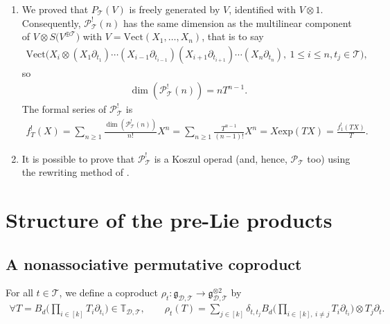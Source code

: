 \documentclass[10pt,a4paper]{amsart}
\numberwithin{equation}{section}
\newcommand{\T}{\mathcal{T}}
\newcommand{\D}{\mathcal{D}}
\newcommand{\g}{\mathfrak{g}}
\newcommand{\bfT}{\mathbb{T}}
\renewcommand{\P}{\mathcal{P}}
\begin{document}
{\samepage\begin{Remark}\qquad

\begin{enumerate}\itemsep=0pt
\item We proved that $P_\T(V)$ is freely generated by $V$, identified with $V\otimes 1$. Consequently,
$\P_\T^!(n)$ has the same dimension as the multilinear component of $V\otimes S\big(V^{\oplus\T}\big)$ with
$V=\mathrm{Vect}(X_1,\dots,X_n)$, that is to say
\begin{gather*}
\mathrm{Vect}\big(X_i\otimes(X_1\partial_{t_1})\cdots (X_{i-1}\partial_{t_{i-1}})(X_{i+1}\partial_{t_{i+1}})
\cdots (X_n\partial_{t_n}),\: 1\leq i \leq n, t_j\in \T\big),
\end{gather*}
so
\begin{gather*}
\dim(\P_\T^!(n))=n T^{n-1}.
\end{gather*}
The formal series of $\P_\T^!$ is
\begin{gather*}
f^!_T(X)=\sum_{n\geq 1} \frac{\dim(\P_\T^!(n))}{n!} X^n
=\sum_{n\geq 1} \frac{T^{n-1}}{(n-1)!} X^n=X\mathrm{exp}(TX)=\frac{f^!_1(TX)}{T}.
\end{gather*}
\item It is possible to prove that $\P_\T^!$ is a Koszul operad (and, hence, $\P_\T$ too) using the rewriting method of \cite{Vallette}.
\end{enumerate}\end{Remark}

}

\section{Structure of the pre-Lie products}

\subsection{A nonassociative permutative coproduct}

For all $t\in \T$, we define a coproduct $\rho_t\colon \g_{\D,\T}\longrightarrow \g_{\D,\T}^{\otimes 2}$ by
\begin{gather*}
\forall T=B_d\bigg(\prod_{i\in [k]} T_i \partial_{t_i}\bigg) \in \bfT_{\D,\T},\qquad
\rho_t(T)=\sum_{j\in [k]}\delta_{t,t_j} B_d\bigg(\prod_{i\in [k],\:i\neq j} T_i \partial_{t_i}\bigg) \otimes T_j \partial_t.
\end{gather*}
\end{document}
